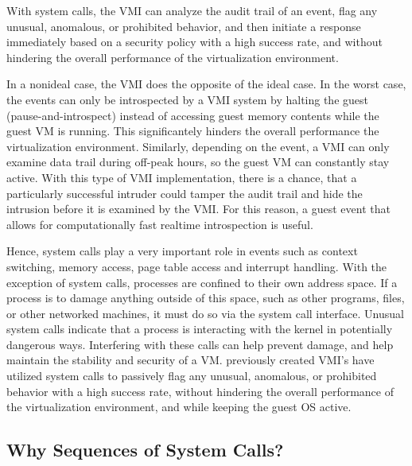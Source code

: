 \documentclass{report}
\begin{document}
\begin{spacing}{1.5}
{With system calls, the VMI can analyze the audit trail of an event, flag any unusual, anomalous, or prohibited behavior, and then initiate a response immediately based on a security policy with a high success rate, and without hindering the overall performance of the virtualization environment.


In a nonideal case, the VMI does the opposite of the ideal case. In the worst case, the events can only be introspected by a VMI system by halting the guest (pause-and-introspect) instead of accessing guest memory contents while the guest VM is running. This significantely hinders the overall performance the virtualization environment. Similarly, depending on the event, a VMI can only examine data trail during off-peak hours, so the guest VM can constantly stay active. With this type of VMI implementation, there is a chance, that a particularly successful intruder could tamper the audit trail and hide the intrusion before it is examined by the VMI. For this reason, a guest event that allows for computationally fast realtime introspection is useful.
\newline
}

{\large
Hence, system calls play a very important role in events such as context switching, memory access, page table access and interrupt handling. With the exception of system calls, processes are confined to their own address space. If a process is to damage anything outside of this space, such as other programs, files, or other networked machines, it must do so via the system call interface. Unusual system calls indicate that a process is interacting with the kernel in potentially dangerous ways. Interfering with these calls can help prevent damage, and help maintain the stability and security of a VM. previously created VMI's have utilized system calls to passively flag any unusual, anomalous, or prohibited behavior with a high success rate, without hindering the overall performance of the virtualization environment, and while keeping the guest OS active.
\newline
}


















\subsection{Why Sequences of System Calls?}


\end{spacing}
\end{document}
